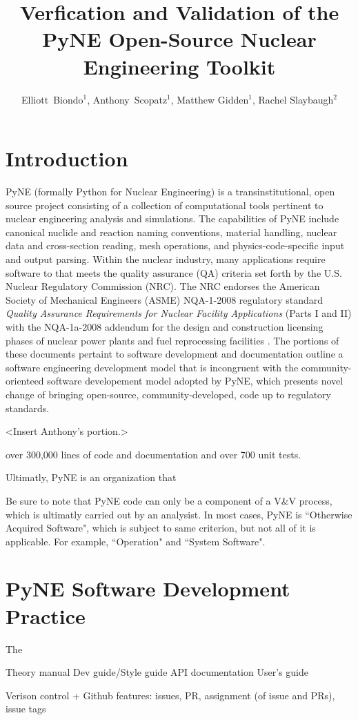 \documentclass{anstrans}
\title{Verfication and Validation of the PyNE Open-Source Nuclear Engineering Toolkit}
\author{Elliott~Biondo$^{1}$, Anthony~Scopatz$^{1}$, Matthew Gidden$^{1}$, Rachel Slaybaugh$^{2}$}
\institute{
\and $^{1}$ The University of Wisconsin-Madison, 1500 Engineering Drive, Madison, WI 53706\\
\and $^{2}$ The University of California, Berkeley, 2521 Hearst Ave, Berkeley, CA 94709 \\
}
\begin{document}
\section{Introduction}

PyNE (formally Python for Nuclear Engineering) is a transinstitutional, open
source project consisting of a collection of computational tools pertinent to
nuclear engineering analysis and simulations. The capabilities of PyNE include
canonical nuclide and reaction naming conventions, material handling, nuclear
data and cross-section reading, mesh operations, and physics-code-specific
input and output parsing. Within the nuclear industry, many applications
require software to that meets the quality assurance (QA) criteria set forth by
the U.S. Nuclear Regulatory Commission (NRC). The NRC endorses the American
Society of Mechanical Engineers (ASME) NQA-1-2008 regulatory standard
\emph{Quality Assurance Requirements for Nuclear Facility Applications} (Parts
I and II) \cite{nrc} with the NQA-1a-2008 addendum \cite{add} for the design
and construction licensing phases of nuclear power plants and fuel reprocessing
facilities \cite{nrc}. The portions of these documents pertaint to software
development and documentation outline a software engineering development model
that is incongruent with the community-orienteed software developement model
adopted by PyNE, which presents novel change of bringing open-source,
community-developed, code up to regulatory standards.

<Insert Anthony's portion.>


over 300,000 lines of code and documentation and over 700 unit tests.


Ultimatly, PyNE is an organization that




Be sure to note that PyNE code can only be a component of a V\&V process, which
is ultimatly carried out by an analysist. In most cases, PyNE is ``Otherwise
Acquired Software", which is subject to same criterion, but not all of it is
applicable. For example, ``Operation" and ``System Software".


\section{PyNE Software Development Practice}

The 


Theory manual
Dev guide/Style guide
API documentation
User's guide

Verison control + Github features: issues, PR, assignment (of issue and PRs), issue tags
\end{document}
